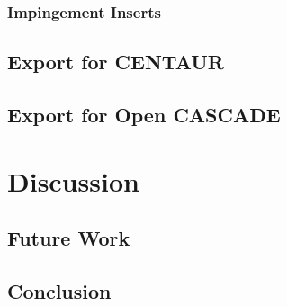 \documentclass[a4paper, 11pt]{report}
\theoremstyle{definition}
\begin{document}
\subsection{Impingement Inserts}
\section{Export for CENTAUR}
\section{Export for Open CASCADE}

\chapter{Discussion}
\section{Future Work}
\section{Conclusion}
\end{document}
